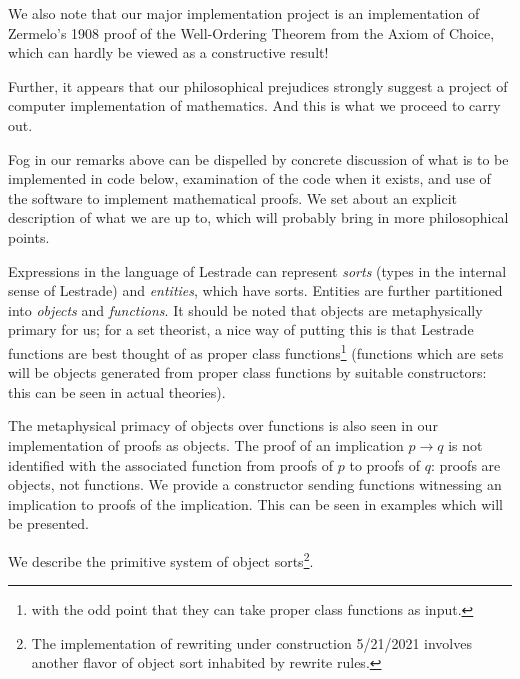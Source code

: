 \documentclass[12pt]{article}
\begin{document}
We also note that our major implementation project is an implementation of Zermelo's 1908 proof of the Well-Ordering Theorem from the Axiom of Choice, which can hardly be viewed as a constructive result!

Further, it appears that our philosophical prejudices strongly suggest a project of computer implementation of mathematics.  And this is what we proceed to carry out.

Fog in our remarks above can be dispelled by concrete discussion of what is to be implemented in code below, examination of the code when it exists, and use of the software to implement
mathematical proofs.  We set about an explicit description of what we are up to, which will probably bring in more philosophical points.

Expressions in the language of Lestrade can represent {\em sorts} (types in the internal sense of Lestrade) and {\em entities\/}, which have sorts.  Entities are further partitioned
into {\em objects\/} and {\em functions\/}.  It should be noted that objects are metaphysically primary for us;  for a set theorist, a nice way of putting this is that Lestrade functions
are best thought of as proper class functions\footnote{with the odd point that they can take proper class functions as input.}  (functions which are sets will be objects generated from proper class functions by suitable constructors:  this can be seen in actual theories).

The metaphysical primacy of objects over functions is also seen in our implementation of proofs as objects.  The proof of an implication $p \rightarrow q$ is not identified with
the associated function from proofs of $p$ to proofs of $q$:  proofs are objects, not functions.  We provide a constructor sending functions witnessing an implication to proofs of the implication.  This can be seen in examples which will be presented.

We describe the primitive system of object sorts\footnote{The implementation of rewriting under construction 5/21/2021 involves another flavor of object sort inhabited by rewrite rules.}. 
\end{document}
